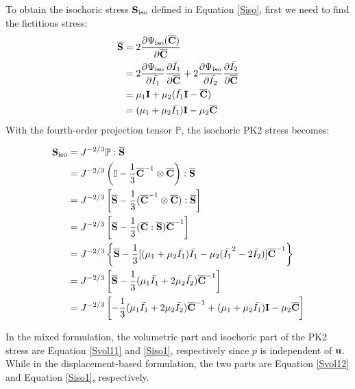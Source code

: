 To obtain the isochoric stress $\bold{S}_\mathrm{iso}$ defined in Equation \ref{Siso}, first we need to find the fictitious stress:
\begin{equation} \label{Sbar1}
\begin{split}
\overline{\bold{S}} &= 2\frac{\partial\Psi_\mathrm{iso}({\overline{\bold{C}})}}{\partial\overline{\bold{C}}} \\
&= 2\frac{\partial\Psi_\mathrm{iso}}{\partial\bar{I_1}} \frac{\partial\bar{I_1}}{\partial\overline{\bold{C}}}  + 2\frac{\partial\Psi_\mathrm{iso}}{\partial\bar{I_2}} \frac{\partial\bar{I_2}}{\partial\overline{\bold{C}}} \\
&= \mu_1{\bold{I}} + \mu_2({\bar{I_1}\bold{I} - \overline{\bold{C}}}) \\
&= (\mu_1+\mu_2\bar{I_1})\bold{I} - \mu_2{\overline{\bold{C}}}
\end{split}
\end{equation}
With the fourth-order projection tensor $\mathbb{P}$, the isochoric PK2 stress becomes:

\begin{equation} \label{Siso1}
\begin{split}
\bold{S}_\mathrm{iso}
&= J^{-2/3}\mathbb{P}:\overline{\bold{S}} \\
&= J^{-2/3}\left( \mathbb{I} - \frac{1}{3}{\overline{\bold{C}}}^{-1} \otimes \overline{\bold{C}} \right) : \overline{\bold{S}} \\
&= J^{-2/3} \left[\overline{\bold{S}} - \frac{1}{3}( \overline{\bold{C}}^{-1} \otimes \overline{\bold{C}} ) : \overline{\bold{S}} \right]  \\
&= J^{-2/3}\left[ \overline{\bold{S}} - \frac{1}{3}(\overline{\bold{C}} : \overline{\bold{S}})\overline{\bold{C}}^{-1} \right]  \\
&= J^{-2/3}\left\{ \overline{\bold{S}} - \frac{1}{3} [(\mu_1+\mu_2\bar{I_1})\bar{I_1} - \mu_2(\bar{I_1}^2-2\bar{I_2})]\overline{\bold{C}}^{-1} \right\} \\
&= J^{-2/3}\left[\overline{\bold{S}} -  \frac{1}{3}(\mu_1\bar{I_1} + 2\mu_2\bar{I_2}) \overline{\bold{C}}^{-1}\right] \\
&= J^{-2/3} \left[    - \frac{1}{3}(\mu_1\bar{I_1} + 2\mu_2\bar{I_2}) \overline{\bold{C}}^{-1}  + (\mu_1 + \mu_2\bar{I_1})\bold{I} - \mu_2\overline{\bold{C}} \right]
\end{split}
\end{equation}

In the mixed formulation, the volumetric part and isochoric part of the PK2 stress are Equation \ref{Svol11} and \ref{Siso1}, respectively since $p$ is independent of $\bold{u}$. While in the displacement-based formulation, the two parts are Equation \ref{Svol12} and Equation \ref{Siso1}, respectively.

